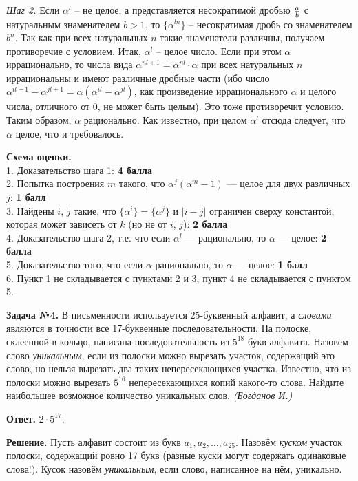 \documentclass[12pt]{article}
\def \Problem#1{\par \bigskip \textbf{Задача №{#1}. }}
\def \solution{\par \bigskip \textbf{Решение. }}
\def \answer{\par \bigskip \textbf{Ответ. }}
\def \marking{\par \bigskip \textbf{Схема оценки. }}
\begin{document}
   \textit{Шаг 2.} Если $\alpha^l$ -- не целое, а представляется несократимой дробью $a\over b$ 
с натуральным знаменателем $b>1$, то $\{\alpha^{ln}\}$ -- несократимая дробь 
со знаменателем $b^n$. Так как при всех натуральных $n$ такие знаменатели различны, 
получаем противоречие с условием. Итак, $\alpha^l$ -- целое число. 
Если при этом $\alpha$ иррационально, то числа вида 
$\alpha^{nl+1}=\alpha^{nl}\cdot \alpha$ при всех натуральных $n$ иррациональны 
и имеют различные дробные части (ибо число 
$\alpha^{il+1}-\alpha^{jl+1}=\alpha (\alpha^{il}-\alpha^{jl})$, как 
произведение иррационального $\alpha$ и целого числа, отличного от 0, не может 
быть целым). Это тоже противоречит условию. Таким образом, $\alpha$ 
рационально. Как известно, при целом $\alpha^l$ отсюда следует, что $\alpha$ 
целое, что и требовалось. 

\marking
\\ 1. Доказательство шага 1: \dotfill \textbf{4 балла}
\\ 2. Попытка построения $m$ такого, что $\alpha^j(\alpha^m-1)$ --- целое для двух различных $j$: \dotfill \textbf{1 балл}
\\ 3. Найдены $i$, $j$ такие, что $\{\alpha^i\}=\{\alpha^j\}$ и $|i-j|$ ограничен сверху константой, которая может зависеть от $k$ (но не от $i$, $j$): \dotfill \textbf{2 балла}
\\ 4. Доказательство шага 2, т.е. что если $\alpha^l$ --- рационально, то $\alpha$ --- целое: \dotfill \textbf{2 балла}
\\ 5. Доказательство того, что если $\alpha$ рационально, то $\alpha$ --- целое: \dotfill \textbf{1 балл}
\\ 6. Пункт 1 не складывается с пунктами 2 и 3, пункт 4 не складывается с пунктом 5.

\Problem{4} В письменности используется 25-буквенный алфавит, а \emph{словами} являются в точности все 17-буквенные последовательности. На полоске, склеенной в кольцо, написана последовательность из $5^{18}$ букв алфавита. Назовём слово \emph{уникальным}, если из полоски можно вырезать участок, содержащий это слово, но нельзя вырезать два таких непересекающихся участка. Известно, что из полоски можно вырезать $5^{16}$ непересекающихся копий какого-то слова. Найдите наибольшее возможное количество уникальных слов.  \textit{(Богданов И.)}

\answer $2\cdot 5^{17}$.
\solution Пусть алфавит состоит из букв $a_1,a_2,\dots,a_{25}$. Назовём \emph{куском} участок полоски, содержащий ровно 17 букв (разные куски могут содержать одинаковые слова!). Кусок назовём \emph{уникальным}, если слово, написанное на нём, уникально.
\end{document}
